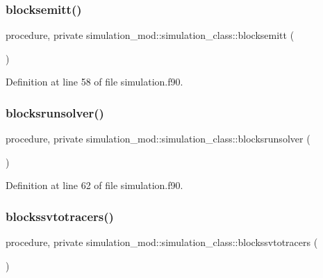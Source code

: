\subsubsection{\texorpdfstring{blocksemitt()}{blocksemitt()}}
{\footnotesize\ttfamily procedure, private simulation\+\_\+mod\+::simulation\+\_\+class\+::blocksemitt (\begin{DoxyParamCaption}{ }\end{DoxyParamCaption})\hspace{0.3cm}{\ttfamily [private]}}



Definition at line 58 of file simulation.\+f90.

\mbox{\label{structsimulation__mod_1_1simulation__class_aa4e34759252b0517c37c79c95ece1167}} 
\subsubsection{\texorpdfstring{blocksrunsolver()}{blocksrunsolver()}}
{\footnotesize\ttfamily procedure, private simulation\+\_\+mod\+::simulation\+\_\+class\+::blocksrunsolver (\begin{DoxyParamCaption}{ }\end{DoxyParamCaption})\hspace{0.3cm}{\ttfamily [private]}}



Definition at line 62 of file simulation.\+f90.

\mbox{\label{structsimulation__mod_1_1simulation__class_a3d1841e43f69c4e5c705244c080af873}} 
\subsubsection{\texorpdfstring{blockssvtotracers()}{blockssvtotracers()}}
{\footnotesize\ttfamily procedure, private simulation\+\_\+mod\+::simulation\+\_\+class\+::blockssvtotracers (\begin{DoxyParamCaption}{ }\end{DoxyParamCaption})\hspace{0.3cm}{\ttfamily [private]}}



